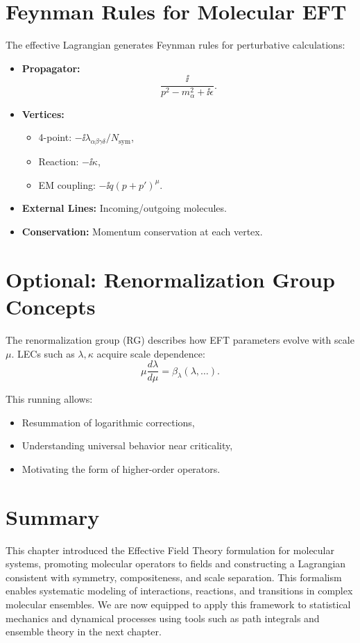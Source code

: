 \section{Feynman Rules for Molecular EFT}
\label{sec:eft_feynman}

The effective Lagrangian generates Feynman rules for perturbative calculations:
\begin{itemize}
	\item \textbf{Propagator:}
	\[
	\frac{\ii}{p^2 - m_\alpha^2 + \ii\epsilon}.
	\]
	\item \textbf{Vertices:}
	\begin{itemize}
		\item 4-point: \( -\ii \lambda_{\alpha\beta\gamma\delta} / N_{\text{sym}} \),
		\item Reaction: \( -\ii \kappa \),
		\item EM coupling: \( -\ii q (p + p')^\mu \).
	\end{itemize}
	\item \textbf{External Lines:} Incoming/outgoing molecules.
	\item \textbf{Conservation:} Momentum conservation at each vertex.
\end{itemize}

\section{Optional: Renormalization Group Concepts}
\label{sec:eft_rg}

The renormalization group (RG) describes how EFT parameters evolve with scale \(\mu\). LECs such as \(\lambda, \kappa\) acquire scale dependence:
\[
\mu \frac{d \lambda}{d\mu} = \beta_\lambda(\lambda, \dots).
\]

This running allows:
\begin{itemize}
	\item Resummation of logarithmic corrections,
	\item Understanding universal behavior near criticality,
	\item Motivating the form of higher-order operators.
\end{itemize}

\section*{Summary}

This chapter introduced the Effective Field Theory formulation for molecular systems, promoting molecular operators to fields and constructing a Lagrangian consistent with symmetry, compositeness, and scale separation. This formalism enables systematic modeling of interactions, reactions, and transitions in complex molecular ensembles. We are now equipped to apply this framework to statistical mechanics and dynamical processes using tools such as path integrals and ensemble theory in the next chapter.
